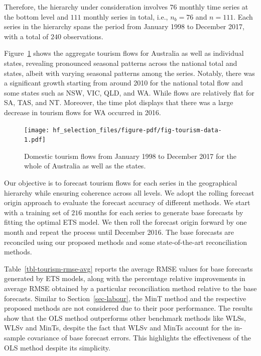\documentclass[
  12pt,
  11pt]{article}
\begin{document}
Therefore, the hierarchy under consideration involves \(76\) monthly
time series at the bottom level and \(111\) monthly series in total,
i.e., \(n_b=76\) and \(n=111\). Each series in the hierarchy spans the
period from January 1998 to December 2017, with a total of \(240\)
observations.

Figure~\ref{fig-tourism-data} shows the aggregate tourism flows for
Australia as well as individual states, revealing pronounced seasonal
patterns across the national total and states, albeit with varying
seasonal patterns among the series. Notably, there was a significant
growth starting from around 2010 for the national total flow and some
states such as NSW, VIC, QLD, and WA. While flows are relatively flat
for SA, TAS, and NT. Moreover, the time plot displays that there was a
large decrease in tourism flows for WA occurred in 2016.

\begin{figure}[!htb]

{\centering \texttt{[image: hf\_selection\_files/figure-pdf/fig-tourism-data-1.pdf]}

}

\caption{\label{fig-tourism-data}Domestic tourism flows from January
1998 to December 2017 for the whole of Australia as well as the states.}

\end{figure}

Our objective is to forecast tourism flows for each series in the
geographical hierarchy while ensuring coherence across all levels. We
adopt the rolling forecast origin approach to evaluate the forecast
accuracy of different methods. We start with a training set of \(216\)
months for each series to generate base forecasts by fitting the optimal
ETS model. We then roll the forecast origin forward by one month and
repeat the process until December 2016. The base forecasts are
reconciled using our proposed methods and some state-of-the-art
reconciliation methods.

Table~\ref{tbl-tourism-rmse-avg} reports the average RMSE values for
base forecasts generated by ETS models, along with the percentage
relative improvements in average RMSE obtained by a particular
reconciliation method relative to the base forecasts. Similar to
Section~\ref{sec-labour}, the MinT method and the respective proposed
methods are not considered due to their poor performance. The results
show that the OLS method outperforms other benchmark methods like WLSs,
WLSv and MinTs, despite the fact that WLSv and MinTs account for the
in-sample covariance of base forecast errors. This highlights the
effectiveness of the OLS method despite its simplicity.
\end{document}
